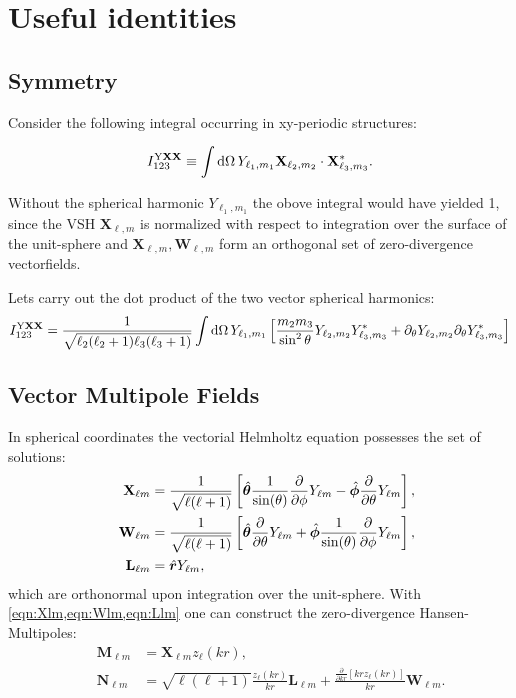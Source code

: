 \section{Useful identities}
\subsection{Symmetry}
Consider the following integral occurring in xy-periodic structures:

\begin{equation}
I^{\mathrm{Y\mathbf{X}\mathbf{X}}}_{123} \equiv \int \mathrm{d} \Omega \, Y_{\ell_1, m_1} \mathbf{X}_{\ell_2, m_2}\cdot \mathbf{X}^*_{\ell_3,m_3}.
\label{eqn:YXX_integral}
\end{equation}

Without the spherical harmonic $Y_{\ell_1,m_1}$ the obove integral would have yielded
1, since the VSH $\mathbf{X}_{\ell, m}$ is normalized with respect to integration over the surface of the unit-sphere and $\mathbf{X}_{\ell,m},\mathbf{W}_{\ell,m}$ form an orthogonal set of zero-divergence vectorfields. 

Lets carry out the dot product of the two vector spherical harmonics:
\begin{equation}
I^{\mathrm{Y\mathbf{X}\mathbf{X}}}_{123} =\frac{1}{\sqrt{\ell_2(\ell_2+1)\ell_3(\ell_3+1)}}\int \mathrm{d} \Omega\, 
Y_{\ell_1,m_1}\left[
\frac{m_2 m_3}{\sin^2\theta} Y_{\ell_2,m_2} Y^*_{\ell_3, m_3}
+\partial_\theta Y_{\ell_2,m_2}\partial_\theta Y^*_{\ell_3,m_3}
\right]
\label{eqn:YXX_integral_split}
\end{equation}
\subsection{Vector Multipole Fields}
In spherical coordinates the vectorial Helmholtz equation possesses the set of
solutions:
\begin{align}
&& \mathbf{X}_{\ell m} &= \frac{1}{\sqrt{\ell(\ell+1)}} \left[
\hat{\bm{\theta}} \frac{1}{\sin(\theta)} \frac{\partial}{\partial \phi} Y_{\ell m} -
\hat{\bm{\phi}} \frac{\partial}{\partial \theta} Y_{\ell m}
\right], \label{eqn:Xlm}\\
&& \mathbf{W}_{\ell m} &= \frac{1}{\sqrt{\ell(\ell+1)}} \left[
\hat{\bm{\theta}} \frac{\partial}{\partial \theta} Y_{\ell m} +
\hat{\bm{\phi}} \frac{1}{\sin(\theta)} \frac{\partial}{\partial \phi} Y_{\ell m} 
\right], \label{eqn:Wlm}\\
&& \mathbf{L}_{\ell m} &= \hat{\bm{r}} Y_{\ell m},\label{eqn:Llm}
\end{align}
which are orthonormal upon integration over the unit-sphere. With \cref{eqn:Xlm,eqn:Wlm,eqn:Llm} one can construct the zero-divergence Hansen-Multipoles:
\begin{align}
&& \mathbf{M}_{\ell m} &= \mathbf{X}_{\ell m} z_\ell(kr), \\
&& \mathbf{N}_{\ell m} &= \sqrt{\ell(\ell+1)} \frac{z_\ell(kr)}{kr} \mathbf{L}_{\ell m}+
\frac{\frac{\partial}{\partial kr}\left[kr z_\ell(kr)\right]}{kr}\mathbf{W}_{\ell m}. \label{eqn:NlmVSH}
\end{align}




